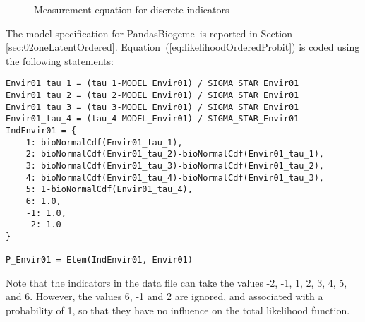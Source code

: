 \documentclass[12pt,a4paper]{article}
\newcommand{\req}[1]{(\ref{#1})}
\newcommand{\PDBIOGEME}{PandasBiogeme}
\begin{document}
\begin{figure}[htb]

\caption{\label{fig:ordinal}Measurement equation for discrete indicators}
\end{figure}

The model specification for \PDBIOGEME\ is reported in Section
\ref{sec:02oneLatentOrdered}. Equation~\req{eq:likelihoodOrderedProbit}
is coded using the following statements:
\begin{lstlisting}
Envir01_tau_1 = (tau_1-MODEL_Envir01) / SIGMA_STAR_Envir01
Envir01_tau_2 = (tau_2-MODEL_Envir01) / SIGMA_STAR_Envir01
Envir01_tau_3 = (tau_3-MODEL_Envir01) / SIGMA_STAR_Envir01
Envir01_tau_4 = (tau_4-MODEL_Envir01) / SIGMA_STAR_Envir01
IndEnvir01 = {
    1: bioNormalCdf(Envir01_tau_1),
    2: bioNormalCdf(Envir01_tau_2)-bioNormalCdf(Envir01_tau_1),
    3: bioNormalCdf(Envir01_tau_3)-bioNormalCdf(Envir01_tau_2),
    4: bioNormalCdf(Envir01_tau_4)-bioNormalCdf(Envir01_tau_3),
    5: 1-bioNormalCdf(Envir01_tau_4),
    6: 1.0,
    -1: 1.0,
    -2: 1.0
}

P_Envir01 = Elem(IndEnvir01, Envir01)
\end{lstlisting}
Note that the indicators in the data file can take the values -2, -1, 1, 2,
3, 4, 5, and 6. However, the values 6, -1 and 2 are ignored, and
associated with a probability of 1, so that they have no influence on
the total likelihood function.
\end{document}
